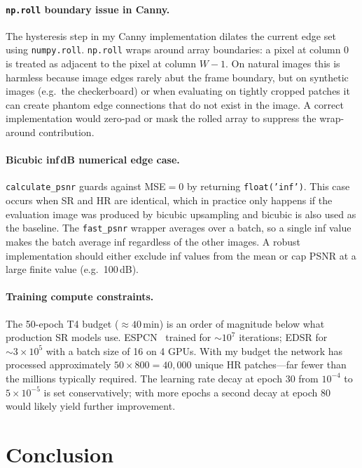 \documentclass{article}
\begin{document}
\paragraph{\texttt{np.roll} boundary issue in Canny.}
The hysteresis step in my Canny implementation dilates the current edge set
using \texttt{numpy.roll}.
\texttt{np.roll} wraps around array boundaries: a pixel at column 0 is treated
as adjacent to the pixel at column $W-1$.
On natural images this is harmless because image edges rarely abut the frame
boundary, but on synthetic images (e.g.\ the checkerboard) or when evaluating
on tightly cropped patches it can create phantom edge connections that do not
exist in the image.
A correct implementation would zero-pad or mask the rolled array to suppress
the wrap-around contribution.

\paragraph{Bicubic inf\,dB numerical edge case.}
\texttt{calculate\_psnr} guards against MSE$=0$ by returning
\texttt{float('inf')}.
This case occurs when SR and HR are identical, which in practice only happens
if the evaluation image was produced by bicubic upsampling and bicubic is also
used as the baseline.
The \texttt{fast\_psnr} wrapper averages over a batch, so a single inf value
makes the batch average inf regardless of the other images.
A robust implementation should either exclude inf values from the mean or cap
PSNR at a large finite value (e.g.\ 100\,dB).

\paragraph{Training compute constraints.}
The 50-epoch T4 budget ($\approx 40$\,min) is an order of magnitude below what
production SR models use.
ESPCN~\cite{shi2016real} trained for $\sim 10^7$ iterations; EDSR for
$\sim 3 \times 10^5$ with a batch size of 16 on 4 GPUs.
With my budget the network has processed approximately $50 \times 800 = 40{,}000$
unique HR patches---far fewer than the millions typically required.
The learning rate decay at epoch 30 from $10^{-4}$ to $5 \times 10^{-5}$ is
set conservatively; with more epochs a second decay at epoch 80 would likely
yield further improvement.

\section{Conclusion}
\end{document}

